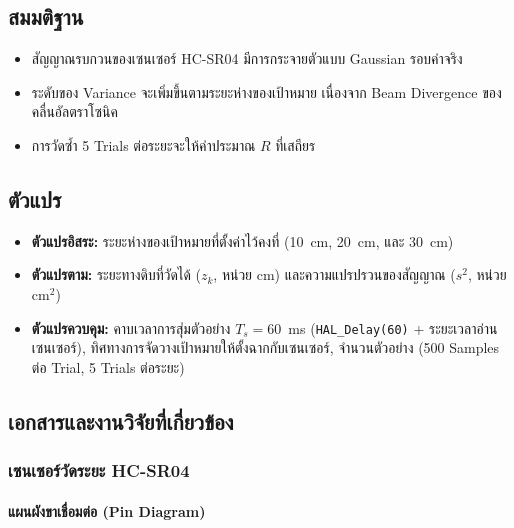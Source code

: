 \subsection{สมมติฐาน}

\begin{itemize}
    \item สัญญาณรบกวนของเซนเซอร์ HC-SR04 มีการกระจายตัวแบบ Gaussian
          รอบค่าจริง
    \item ระดับของ Variance จะเพิ่มขึ้นตามระยะห่างของเป้าหมาย
          เนื่องจาก Beam Divergence ของคลื่นอัลตราโซนิค
    \item การวัดซ้ำ 5 Trials ต่อระยะจะให้ค่าประมาณ $R$
          ที่เสถียร
\end{itemize}

\subsection{ตัวแปร}

\begin{itemize}
    \item \textbf{ตัวแปรอิสระ:} ระยะห่างของเป้าหมายที่ตั้งค่าไว้คงที่
          (10~cm, 20~cm, และ 30~cm)
    \item \textbf{ตัวแปรตาม:} ระยะทางดิบที่วัดได้ ($z_k$, หน่วย cm)
          และความแปรปรวนของสัญญาณ ($s^2$, หน่วย cm$^2$)
    \item \textbf{ตัวแปรควบคุม:} คาบเวลาการสุ่มตัวอย่าง $T_s = 60$~ms
          (\texttt{HAL\_Delay(60)} + ระยะเวลาอ่านเซนเซอร์),
          ทิศทางการจัดวางเป้าหมายให้ตั้งฉากกับเซนเซอร์,
          จำนวนตัวอย่าง (500 Samples ต่อ Trial, 5 Trials ต่อระยะ)
\end{itemize}

\subsection{เอกสารและงานวิจัยที่เกี่ยวข้อง}

\subsubsection{เซนเซอร์วัดระยะ HC-SR04}

\paragraph{แผนผังขาเชื่อมต่อ (Pin Diagram)}


